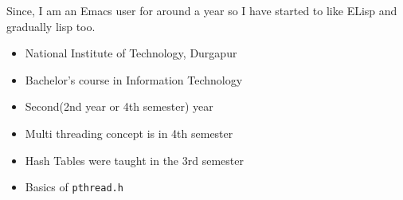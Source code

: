 \documentclass[11pt]{article}
\begin{document}
Since, I am an Emacs user for around a year so I have started to like ELisp and
gradually lisp too.

\begin{itemize}
\item National Institute of Technology, Durgapur
\item Bachelor's course in Information Technology
\item Second(2nd year or 4th semester) year
\item Multi threading concept is in 4th semester
\item Hash Tables were taught in the 3rd semester
\item Basics of \texttt{pthread.h}
\end{itemize}
\end{document}
